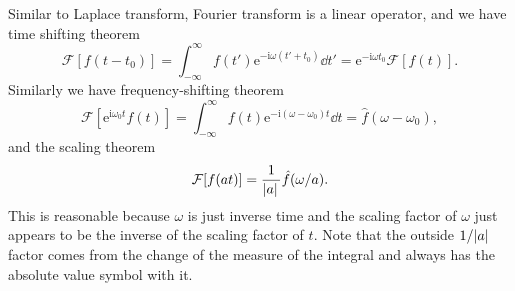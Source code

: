 \documentclass[hyperref, a4paper]{article}
\newcommand*{\ii}{\mathrm{i}}
\newcommand*{\ee}{\mathrm{e}}
\newcommand*{\fourier}{\mathcal{F}}
\begin{document}
Similar to Laplace transform, 
Fourier transform is a linear operator, 
and we have time shifting theorem 
\begin{equation}
    \fourier [f(t - t_0)] = \int_{-\infty}^{\infty} f(t') \ee^{- \ii \omega (t' + t_0)} \dd{t'} 
    = \ee^{- \ii \omega t_0} \fourier[f(t)].
\end{equation}
Similarly we have frequency-shifting theorem 
\begin{equation}
    \fourier[\ee^{\ii \omega_0 t} f(t)]
    = \int_{-\infty}^{\infty} f(t) \ee^{- \ii (\omega - \omega_0) t} \dd{t} 
    = \hat{f}(\omega - \omega_0),
\end{equation}
and the scaling theorem 
\begin{equation}
    \fourier [f(at)] = \frac{1}{\abs*{a}} \hat{f}(\omega / a).
\end{equation}
This is reasonable because $\omega$ is just inverse time 
and the scaling factor of $\omega$ just appears to be 
the inverse of the scaling factor of $t$.
Note that the outside $1 / \abs*{a}$ factor comes from 
the change of the measure of the integral
and always has the absolute value symbol with it. 
\end{document}
